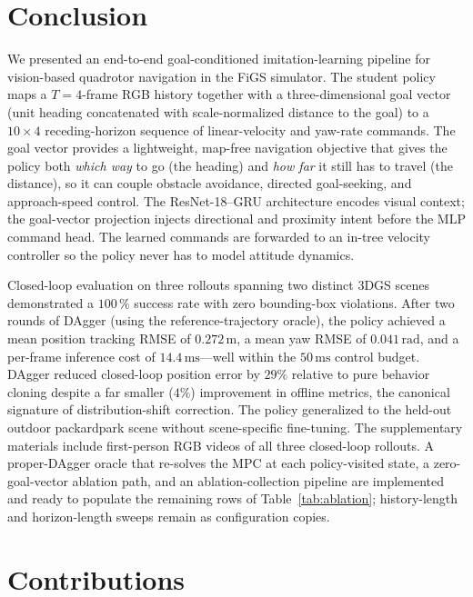\documentclass[10pt,twocolumn,letterpaper]{article}
\begin{document}
\section{Conclusion}
\label{sec:conclusion}

We presented an end-to-end goal-conditioned imitation-learning pipeline for vision-based quadrotor navigation in the FiGS simulator. The student policy maps a $T{=}4$-frame RGB history together with a three-dimensional goal vector (unit heading concatenated with scale-normalized distance to the goal) to a $10\times4$ receding-horizon sequence of linear-velocity and yaw-rate commands. The goal vector provides a lightweight, map-free navigation objective that gives the policy both \emph{which way} to go (the heading) and \emph{how far} it still has to travel (the distance), so it can couple obstacle avoidance, directed goal-seeking, and approach-speed control. The ResNet-18--GRU architecture encodes visual context; the goal-vector projection injects directional and proximity intent before the MLP command head. The learned commands are forwarded to an in-tree velocity controller so the policy never has to model attitude dynamics.

Closed-loop evaluation on three rollouts spanning two distinct 3DGS scenes demonstrated a $100\,\%$ success rate with zero bounding-box violations. After two rounds of DAgger (using the reference-trajectory oracle), the policy achieved a mean position tracking RMSE of $0.272\,\mathrm{m}$, a mean yaw RMSE of $0.041\,\mathrm{rad}$, and a per-frame inference cost of $14.4\,\mathrm{ms}$---well within the $50\,\mathrm{ms}$ control budget. DAgger reduced closed-loop position error by $29\%$ relative to pure behavior cloning despite a far smaller ($4\%$) improvement in offline metrics, the canonical signature of distribution-shift correction. The policy generalized to the held-out outdoor packardpark scene without scene-specific fine-tuning. The supplementary materials include first-person RGB videos of all three closed-loop rollouts. A proper-DAgger oracle that re-solves the MPC at each policy-visited state, a zero-goal-vector ablation path, and an ablation-collection pipeline are implemented and ready to populate the remaining rows of Table~\ref{tab:ablation}; history-length and horizon-length sweeps remain as configuration copies.

\section*{Contributions}
\end{document}
